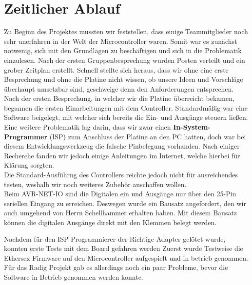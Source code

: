 \chapter{Zeitlicher Ablauf}
Zu Beginn des Projektes mussten wir feststellen, dass einige Teammitglieder noch sehr 
unerfahren in der Welt der Microcontroller waren. Somit war es zunächst notwenig, sich mit 
den Grundlagen zu beschäftigen und sich in die Problematik einzulesen. Nach der ersten Gruppenbesprechung 
wurden Posten verteilt und ein grober Zeitplan erstellt. Schnell stellte sich 
heraus, dass wir ohne eine erste Besprechung und ohne die Platine nicht wissen, ob unsere 
Ideen und Vorschläge überhaupt umsetzbar sind, geschweige denn den Anforderungen entsprechen. \\
Nach der ersten Besprechung, in welcher wir die Platine überreicht bekamen, begannen die ersten
 Einarbeitungen mit dem Controller. Standardmäßig war eine Software beigelegt, mit welcher sich 
 bereits die Ein- und Ausgänge steuern ließen. \\
 Eine weitere Problematik lag darin, dass wir zwar einen \textbf{In-System-Programmer} (ISP) zum 
Anschluss der Platine an den PC hatten, doch war bei diesem Entwicklungswerkzeug
die falsche Pinbelegung vorhanden. Nach einiger Recherche fanden wir jedoch einige Anleitungen 
im Internet, welche hierbei für Klärung sorgten.\\
Die Standard-Ausführng des Controllers reichte jedoch nicht für ausreichendes testen, weshalb wir 
noch weiteres Zubehör anschaffen wollen.\\
Beim AVR-NET-IO sind die Digitalen ein und Ausgänge nur über den 25-Pin seriellen Eingang zu erreichen.
Deswegen wurde ein Bausatz angefordert, den wir auch umgehend von Herrn Schellhammer erhalten haben.
Mit diesem Bausatz können die digitalen Ausgänge direkt mit den Klemmen belegt werden.

Nachdem für den ISP Programmierer der Richtige Adapter gelötet wurde, konnten erste Tests mit dem Board gefahren werden
Zuerst wurde Testweise die Ethersex Firmware auf den Microcontroller aufgespielt und in betrieb genommen.
Für das Radig Projekt gab es allerdings noch ein paar Probleme, bevor die Software in Betrieb genommen werden konnte.



